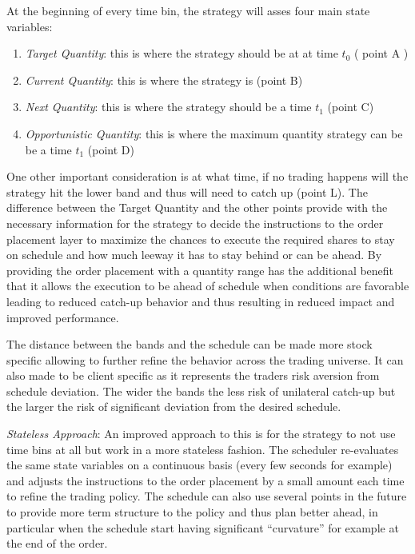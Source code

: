At the beginning of every time bin, the strategy will asses four main state variables:

\begin{enumerate}
\item\emph{Target Quantity}: this is where the strategy should be at at time $t_0$ ( point A )
\item\emph{Current Quantity}: this is where the strategy is (point B)
\item\emph{Next Quantity}: this is where the strategy should be a time $t_1$ (point C)
\item\emph{Opportunistic Quantity}: this is where the maximum quantity strategy can be be a time $t_1$ (point D)
\end{enumerate}


One other important consideration is at what time, if no trading happens will the strategy hit the lower band and thus will need to catch up (point L). The difference between the Target Quantity and the other points provide with the necessary  information for the strategy to decide the instructions to the order placement layer to maximize the chances to execute the required shares to stay on schedule and how much leeway it has to stay behind or can be ahead. By providing the order placement with a quantity range has the additional benefit that it allows the execution to be ahead of schedule when conditions are favorable leading to reduced catch-up behavior and thus resulting in reduced impact and improved performance.


The distance between the bands and the schedule can be made more stock specific allowing to further refine the behavior across the trading universe. It can also made to be client specific as it represents the traders risk aversion from schedule deviation. The wider the bands the less risk of unilateral catch-up but the larger the risk of significant deviation from the desired schedule. \twomedskip


\noindent\emph{Stateless Approach}: An improved approach to this is for the strategy to not use time bins at all but work in a more stateless fashion. The scheduler re-evaluates the same state variables on a continuous basis (every few seconds for example) and adjusts the instructions to the order placement by a small amount each time to refine the trading policy. The schedule can also use several points in the future to provide more term structure to the policy and thus plan better ahead, in particular when the schedule start having significant ``curvature'' for example at the end of the order. \twomedskip


